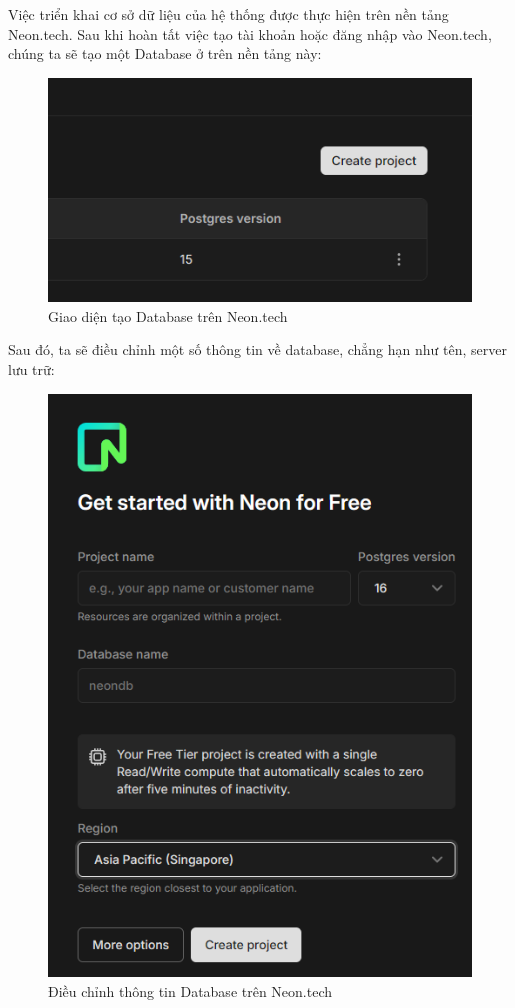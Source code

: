 Việc triển khai cơ sở dữ liệu của hệ thống được thực hiện trên nền tảng Neon.tech.
Sau khi hoàn tất việc tạo tài khoản hoặc đăng nhập vào Neon.tech, chúng ta sẽ tạo một Database ở trên nền tảng này:
\begin{figure}[H]
    \centering
    \includegraphics[width=\linewidth]{Content/Hiện thực hệ thống/images/createProjectDB.png}
    \caption{Giao diện tạo Database trên Neon.tech}
    \label{fig:Tạo Database}
\end{figure}
Sau đó, ta sẽ điều chỉnh một số thông tin về database, chẳng hạn như tên, server lưu trữ:
\begin{figure}[H]
    \centering
    \includegraphics[width=\linewidth]{Content/Hiện thực hệ thống/images/projectDBinfo.png}
    \caption{Điều chỉnh thông tin Database trên Neon.tech}
    \label{fig:Điều chỉnh thông tin Database}
\end{figure}

